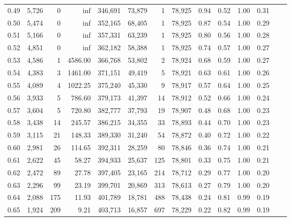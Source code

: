 \begin{tabular}{rrrrrrrrrrrrrr}
0.49 &  5,726 &      0 &      inf &  346,691 &   73,879 &       1 &  78,925 &  0.94 &  0.52 &  1.00 &      0.31 \\
0.50 &  5,474 &      0 &      inf &  352,165 &   68,405 &       1 &  78,925 &  0.87 &  0.54 &  1.00 &      0.29 \\
0.51 &  5,166 &      0 &      inf &  357,331 &   63,239 &       1 &  78,925 &  0.80 &  0.56 &  1.00 &      0.28 \\
0.52 &  4,851 &      0 &      inf &  362,182 &   58,388 &       1 &  78,925 &  0.74 &  0.57 &  1.00 &      0.27 \\
0.53 &  4,586 &      1 &  4586.00 &  366,768 &   53,802 &       2 &  78,924 &  0.68 &  0.59 &  1.00 &      0.27 \\
0.54 &  4,383 &      3 &  1461.00 &  371,151 &   49,419 &       5 &  78,921 &  0.63 &  0.61 &  1.00 &      0.26 \\
0.55 &  4,089 &      4 &  1022.25 &  375,240 &   45,330 &       9 &  78,917 &  0.57 &  0.64 &  1.00 &      0.25 \\
0.56 &  3,933 &      5 &   786.60 &  379,173 &   41,397 &      14 &  78,912 &  0.52 &  0.66 &  1.00 &      0.24 \\
0.57 &  3,604 &      5 &   720.80 &  382,777 &   37,793 &      19 &  78,907 &  0.48 &  0.68 &  1.00 &      0.23 \\
0.58 &  3,438 &     14 &   245.57 &  386,215 &   34,355 &      33 &  78,893 &  0.44 &  0.70 &  1.00 &      0.23 \\
0.59 &  3,115 &     21 &   148.33 &  389,330 &   31,240 &      54 &  78,872 &  0.40 &  0.72 &  1.00 &      0.22 \\
0.60 &  2,981 &     26 &   114.65 &  392,311 &   28,259 &      80 &  78,846 &  0.36 &  0.74 &  1.00 &      0.21 \\
0.61 &  2,622 &     45 &    58.27 &  394,933 &   25,637 &     125 &  78,801 &  0.33 &  0.75 &  1.00 &      0.21 \\
0.62 &  2,472 &     89 &    27.78 &  397,405 &   23,165 &     214 &  78,712 &  0.29 &  0.77 &  1.00 &      0.20 \\
0.63 &  2,296 &     99 &    23.19 &  399,701 &   20,869 &     313 &  78,613 &  0.27 &  0.79 &  1.00 &      0.20 \\
0.64 &  2,088 &    175 &    11.93 &  401,789 &   18,781 &     488 &  78,438 &  0.24 &  0.81 &  0.99 &      0.19 \\
0.65 &  1,924 &    209 &     9.21 &  403,713 &   16,857 &     697 &  78,229 &  0.22 &  0.82 &  0.99 &      0.19 \\

\end{tabular}
